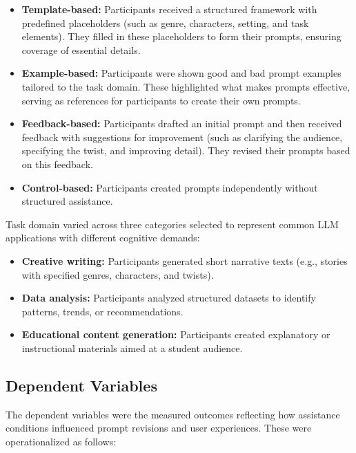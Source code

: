 \begin{itemize}
    \item \textbf{Template-based:} Participants received a structured framework with predefined placeholders (such as genre, characters, setting, and task elements). They filled in these placeholders to form their prompts, ensuring coverage of essential details.
    
    \item \textbf{Example-based:} Participants were shown good and bad prompt examples tailored to the task domain. These highlighted what makes prompts effective, serving as references for participants to create their own prompts.
    
    \item \textbf{Feedback-based:} Participants drafted an initial prompt and then received feedback with suggestions for improvement (such as clarifying the audience, specifying the twist, and improving detail). They revised their prompts based on this feedback.
    
    \item \textbf{Control-based:} Participants created prompts independently without structured assistance.
\end{itemize}

Task domain varied across three categories selected to represent common LLM applications with different cognitive demands:

\begin{itemize}
    \item \textbf{Creative writing:} Participants generated short narrative texts (e.g., stories with specified genres, characters, and twists).
    
    \item \textbf{Data analysis:} Participants analyzed structured datasets to identify patterns, trends, or recommendations.
    
    \item \textbf{Educational content generation:} Participants created explanatory or instructional materials aimed at a student audience.
\end{itemize}

\subsection{\textbf{Dependent Variables}}
The dependent variables were the measured outcomes reflecting how assistance conditions influenced prompt revisions and user experiences. These were operationalized as follows:

